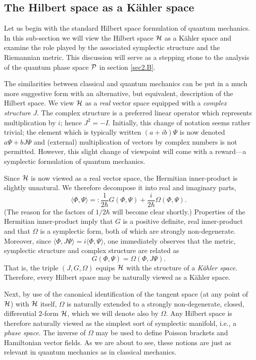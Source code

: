 \documentclass[12pt,aps,eqsecnum,tighten,nofootinbib]{revtex4-2}
\def\be{\begin{equation}}
\def\ee{\end{equation}}
\def\<{\langle}
\def\>{\rangle}
\def\i{{i}}
\def\H{{\cal H}}
\def\P{{\cal P}}
\def\W{\Omega}
\begin{document}
\subsection{The Hilbert space as a K\"ahler space}
\label{sec2.A}

Let us begin with the standard Hilbert space formulation of quantum
mechanics.  In this sub-section we will view the Hilbert space $\H$ as
a K\"ahler space and examine the role played by the associated
symplectic structure and the Riemannian metric.  This discussion will
serve as a stepping stone to the analysis of the quantum phase space
$\P$ in section \ref{sec2.B}.

The similarities between classical and quantum mechanics can be put in
a much more suggestive form with an alternative, but equivalent,
description of the Hilbert space.  We view $\H$ as a {\em real} vector
space equipped with a {\em complex structure} $J$.  The complex
structure is a preferred linear operator which represents
multiplication by $\i$; hence $J^2 = -{I}$.  Initially, this change of
notation seems rather trivial; the element which is typically written
$(a + \i b)\Psi$ is now denoted $a\Psi + b J\Psi$ and (external)
multiplication of vectors by complex numbers is not permitted.
However, this slight change of viewpoint will come with a reward---a
symplectic formulation of quantum mechanics.

Since $\H$ is now viewed as a real vector space, the Hermitian
inner-product is slightly unnatural.  We therefore decompose it into
real and imaginary parts,
%
\be \< \Phi, \Psi\>
=: \frac{1}{2\hbar}G(\Phi, \Psi) + \frac{\i}{2\hbar}\W(\Phi, \Psi).
\ee 
%
(The reason for the factors of $1/2\hbar$ will become clear shortly.)
Properties of the Hermitian inner-product imply that $G$ is a positive
definite, real inner-product and that $\W$ is a symplectic form, both
of which are strongly non-degenerate.  Moreover, since $\<\Phi, J
\Psi\> = \i \<\Phi, \Psi\>$, one immediately observes that the metric,
symplectic structure and complex structure are related as
%
\be
\label{kahler_reln} G(\Phi, \Psi) = \W(\Phi, J \Psi).  
\ee 
%
That is, the triple $(J, G, \W)$ equips $\H$ with the structure of a
{\em K\"ahler space}.  Therefore, every Hilbert space may be naturally
viewed as a K\"ahler space.

Next, by use of the canonical identification of the tangent space (at
any point of $\H$) with $\H$ itself, $\W$ is naturally extended to a
strongly non-degenerate, closed, differential 2-form $\H$, which we
will denote also by $\W$.  Any Hilbert space is therefore naturally
viewed as the simplest sort of symplectic manifold, i.e., a {\em phase
space}.  The inverse of $\W$ may be used to define Poisson brackets
and Hamiltonian vector fields.  As we are about to see, these notions
are just as relevant in quantum mechanics as in classical mechanics.
\end{document}
